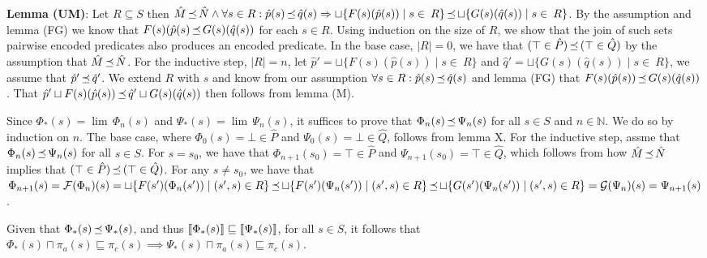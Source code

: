\textbf{Lemma (UM)}: Let $R \subseteq S$ then $\hat M \operatorname{\mathrel{\preceq}} \hat N \wedge \forall s \in R : \hat p(s) \operatorname{\mathrel{\preceq}} \hat q(s) \Rightarrow \sqcup \{ F(s)(\hat p(s)) \mid s \in \: R \} \operatorname{\mathrel{\preceq}} \sqcup \{ G(s)(\hat q(s)) \mid s \in \: R \}$. By the assumption and lemma (FG) we know that $F(s)(\hat p(s) \operatorname{\mathrel{\preceq}} G(s)(\hat q(s))$ for each $s \in R$. Using induction on the size of $R$, we show that the join of such sets pairwise encoded predicates also produces an encoded predicate. In the base case, $| R | = 0$, we have that $(\top \in \hat P) \operatorname{\mathrel{\preceq}} \, (\top \in \hat Q)$ by the assumption that $\hat M \operatorname{\mathrel{\preceq}} \hat N$. For the inductive step, $| R | = n$, let $\hat p' = \sqcup \{ F(s)(\hat p(s)) \mid s \in \: R \}$ and $\hat q' = \sqcup \{ G(s)(\hat q(s)) \mid s \in \: R \}$, we assume that $\hat p' \operatorname{\mathrel{\preceq}} \hat q'$. We extend $R$ with $s$ and know from our assumption $\forall s \in R : \hat p(s) \operatorname{\mathrel{\preceq}} \hat q(s)$ and lemma (FG) that $F(s)(\hat p(s)) \operatorname{\mathrel{\preceq}} G(s)(\hat q(s))$. That $\hat p' \sqcup F(s)(\hat p(s)) \operatorname{\mathrel{\preceq}} \hat q' \sqcup G(s)(\hat q(s))$ then follows from lemma (M).




Since $\Phi_{*}(s) = \lim \, \Phi_{n}(s)$ and $\Psi_{*}(s) = \lim \, \Psi_{n}(s)$, it suffices to prove that $\Phi_{n}(s) \operatorname{\mathrel{\preceq}} \Psi_{n}(s)$ for all $s \in S$ and $n \in \mathbb{N}$. We do so by induction on $n$. The base case, where $\Phi_{0}(s) = \bot \in \hat P$ and $\Psi_{0}(s) = \bot \in \hat Q$, follows from lemma X. For the inductive step, assme that $\Phi_{n}(s) \operatorname{\mathrel{\preceq}} \Psi_{n}(s)$ for all $s \in S$. For $s = s_{0}$, we have that $\Phi_{n+1}(s_{0}) = \top \in \hat P$ and $\Psi_{n+1}(s_{0}) = \top \in \hat Q$, which follows from how $\hat M \operatorname{\mathrel{\preceq}} \hat N$ implies that $(\top \in \hat P) \operatorname{\mathrel{\preceq}} \, (\top \in \hat Q)$. For any $s \neq s_{0}$, we have that $\Phi_{n+1}(s) = \mathcal{F}(\Phi_{n})(s) = \sqcup \{ F(s')(\Phi_{n}(s')) \mid (s',s) \in R \} \operatorname{\mathrel{\preceq}} \sqcup \{ F(s')(\Psi_{n}(s')) \mid (s',s) \in R \} \operatorname{\mathrel{\preceq}} \sqcup \{ G(s')(\Psi_{n}(s')) \mid (s',s) \in R \} = \mathcal{G}(\Psi_{n})(s) = \Psi_{n+1}(s)$.

Given that $\Phi_{*}(s) \operatorname{\mathrel{\preceq}} \Psi_{*}(s)$, and thus $\llbracket\Phi_{*}(s)\rrbracket \sqsubseteq \llbracket\Psi_{*}(s)\rrbracket$, for all $s \in S$, it follows that $\Phi_{*}(s) \sqcap \pi_{a}(s) \sqsubseteq \pi_{c}(s) \implies \Psi_{*}(s) \sqcap \pi_{a}(s) \sqsubseteq \pi_{c}(s)$.

